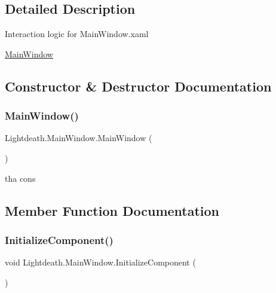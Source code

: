 \subsection{Detailed Description}
Interaction logic for Main\+Window.\+xaml 

\hyperlink{class_lightdeath_1_1_main_window}{Main\+Window} 

\subsection{Constructor \& Destructor Documentation}
\hypertarget{class_lightdeath_1_1_main_window_a475965b66868ac540ab27674cc60d6e0}{}\label{class_lightdeath_1_1_main_window_a475965b66868ac540ab27674cc60d6e0} 
\subsubsection{\texorpdfstring{Main\+Window()}{MainWindow()}}
{\footnotesize\ttfamily Lightdeath.\+Main\+Window.\+Main\+Window (\begin{DoxyParamCaption}{ }\end{DoxyParamCaption})\hspace{0.3cm}{\ttfamily [inline]}}



tha cons 



\subsection{Member Function Documentation}
\hypertarget{class_lightdeath_1_1_main_window_a45aa2740eadb2180828832d1994a1307}{}\label{class_lightdeath_1_1_main_window_a45aa2740eadb2180828832d1994a1307} 
\subsubsection{\texorpdfstring{Initialize\+Component()}{InitializeComponent()}\hspace{0.1cm}{\footnotesize\ttfamily [1/2]}}
{\footnotesize\ttfamily void Lightdeath.\+Main\+Window.\+Initialize\+Component (\begin{DoxyParamCaption}{ }\end{DoxyParamCaption})\hspace{0.3cm}{\ttfamily [inline]}}



